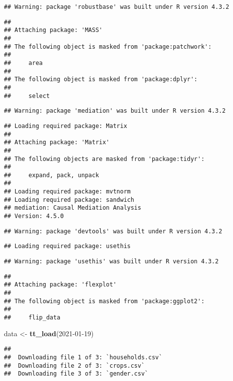 \documentclass[
]{article}
\newenvironment{Shaded}{\begin{snugshade}}{\end{snugshade}}
\newcommand{\FunctionTok}[1]{\textcolor[rgb]{0.13,0.29,0.53}{\textbf{#1}}}
\newcommand{\NormalTok}[1]{#1}
\newcommand{\OtherTok}[1]{\textcolor[rgb]{0.56,0.35,0.01}{#1}}
\newcommand{\StringTok}[1]{\textcolor[rgb]{0.31,0.60,0.02}{#1}}
\begin{document}
\begin{verbatim}
## Warning: package 'robustbase' was built under R version 4.3.2
\end{verbatim}

\begin{verbatim}
## 
## Attaching package: 'MASS'
## 
## The following object is masked from 'package:patchwork':
## 
##     area
## 
## The following object is masked from 'package:dplyr':
## 
##     select
\end{verbatim}

\begin{verbatim}
## Warning: package 'mediation' was built under R version 4.3.2
\end{verbatim}

\begin{verbatim}
## Loading required package: Matrix
## 
## Attaching package: 'Matrix'
## 
## The following objects are masked from 'package:tidyr':
## 
##     expand, pack, unpack
## 
## Loading required package: mvtnorm
## Loading required package: sandwich
## mediation: Causal Mediation Analysis
## Version: 4.5.0
\end{verbatim}

\begin{verbatim}
## Warning: package 'devtools' was built under R version 4.3.2
\end{verbatim}

\begin{verbatim}
## Loading required package: usethis
\end{verbatim}

\begin{verbatim}
## Warning: package 'usethis' was built under R version 4.3.2
\end{verbatim}

\begin{verbatim}
## 
## Attaching package: 'flexplot'
## 
## The following object is masked from 'package:ggplot2':
## 
##     flip_data
\end{verbatim}

\begin{Shaded}
\begin{Highlighting}[]
\NormalTok{data }\OtherTok{\textless{}{-}} \FunctionTok{tt\_load}\NormalTok{(}\StringTok{\textquotesingle{}2021{-}01{-}19\textquotesingle{}}\NormalTok{)}
\end{Highlighting}
\end{Shaded}

\begin{verbatim}
## 
##  Downloading file 1 of 3: `households.csv`
##  Downloading file 2 of 3: `crops.csv`
##  Downloading file 3 of 3: `gender.csv`
\end{verbatim}
\end{document}
